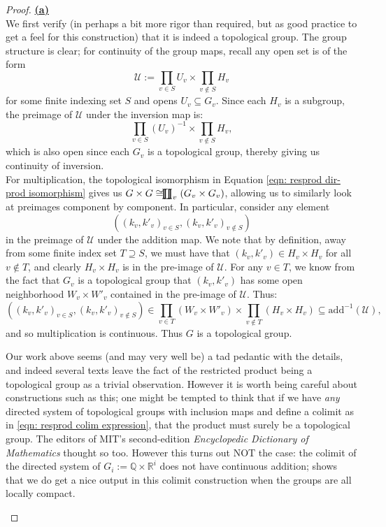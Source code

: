 \documentclass[11pt, x11names, openany]{book}
\newcommand{\qq}{\mathbb{Q}}
\newcommand{\rr}{\mathbb{R}}
\newcommand{\calu}{\mathcal{U}}
\renewcommand{\brack}[1]{\left(   #1 \right)}
\newcommand{\rprod}{
    \mathrel{\ooalign{\hidewidth $\prod$ \hidewidth \cr $\coprod$}}
}
\newcommand{\inv}[1]{#1^{-1}}
\begin{document}
\begin{proof}
\textbf{\underline{(a)}}\\
We first verify (in perhaps a bit more rigor than required, but as good practice to get a feel for this construction) that it is indeed a topological group. The group structure is clear; for continuity of the group maps, recall any open set is of the form
\begin{equation*}
    \calu := \prod_{v \in S} U_v \times \prod_{v \notin S} H_v
\end{equation*}
for some finite indexing set $S$ and opens $U_v \subseteq G_v$. Since each $H_v$ is a subgroup, the preimage of $\calu$ under the inversion map is:
\begin{equation*}
    \prod_{v \in S} \inv{\brack{U_v}} \times \prod_{v \notin S} H_v,
\end{equation*}
which is also open since each $G_v$ is a topological group, thereby giving us continuity of inversion.\\
For multiplication, the topological isomorphism in Equation \ref{eqn: resprod dir-prod isomorphism} gives us $G \times G \cong \rprod_v (G_v \times G_v)$, allowing us to similarly look at preimages component by component. In particular, consider any element
\begin{equation*}
    \brack{ \brack{k_v, k'_v}_{v \in S}, \brack{k_v, k'_v}_{v \notin S}}
\end{equation*}
in the preimage of $\calu$ under the addition map. We note that by definition, away from some finite index set $T \supseteq S$, we must have that $(k_v, k'_v) \in H_v \times H_v$ for all $v \notin T$, and clearly $H_v \times H_v$ is in the pre-image of $\calu$. For any $v \in T$, we know from the fact that $G_v$ is a topological group that $(k_v, k'_v)$ has some open neighborhood $W_v \times W'_v$ contained in the pre-image of $\calu$. Thus:
\begin{equation*}
    \brack{ \brack{k_v, k'_v}_{v \in S}, \brack{k_v, k'_v}_{v \notin S}}  \in \prod_{v \in T} \brack{W_v \times W'_v} \times \prod_{v \notin T} \brack{H_v \times H_v} \subseteq \inv{\text{add}}(\calu),  
\end{equation*}
and so multiplication is continuous. Thus $G$ is a topological group.
\begin{warning}
    Our work above seems (and may very well be) a tad pedantic with the details, and indeed several texts leave the fact of the restricted product being a topological group as a trivial observation. However it is worth being careful about constructions such as this; one might be tempted to think that if we have \textit{any} directed system of topological groups with inclusion maps and define a colimit as in \ref{eqn: resprod colim expression}, that the product must surely be a topological group. The editors of MIT's second-edition \textit{Encyclopedic Dictionary of Mathematics} thought so too. However this turns out NOT the case: the colimit of the directed system of $G_i := \qq \times \rr^i$ does not have continuous addition; \cite{Shimomura-topgrp-colimit} shows that we do get a nice output in this colimit construction when the groups are all locally compact.

\end{warning}
\end{proof}
\end{document}
